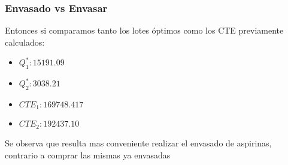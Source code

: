\begin{homeworkProblem}
\subsubsection{Envasado vs Envasar}
Entonces si comparamos tanto los lotes óptimos como los CTE previamente calculados:
\begin{itemize}
    \item $Q^*_1:15191.09$
    \item $Q^*_2:3038.21$
    \item $CTE_1:169748.417$
    \item $CTE_2:192437.10$
\end{itemize}
Se observa que resulta mas conveniente realizar el envasado de aspirinas, contrario a comprar las mismas ya envasadas
\end{homeworkProblem}